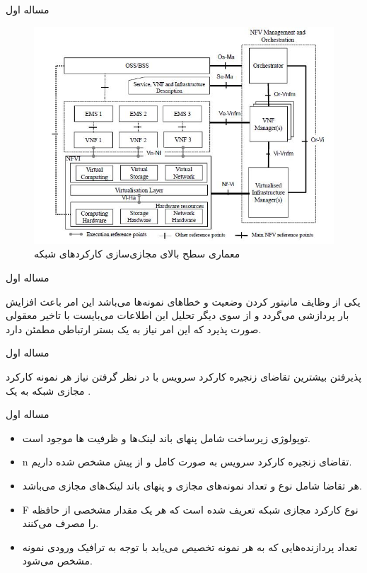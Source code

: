 \documentclass{beamer}
\makeatletter
\newcommand{\RTList}{\raggedleft\rightskip\@totalleftmargin}
\makeatother
\begin{document}
\begin{persian}
\begin{frame}{مساله اول}
\begin{center}
\begin{figure}
        \includegraphics[scale=0.4]{images/nfv-arch.jpg}
        \caption{معماری سطح بالای مجازی‌سازی کارکردهای شبکه}
    \end{figure}\end{center}
\end{frame}
\begin{frame}{مساله اول}
    \par
    یکی از وظایف  مانیتور کردن وضعیت و خطاهای نمونه‌ها می‌باشد
    این امر باعث افزایش بار پردازشی  می‌گردد
    و از سوی دیگر تحلیل این اطلاعات می‌بایست با تاخیر معقولی صورت پذیرد که این امر
    نیاز به یک بستر ارتباطی مطمئن دارد.
\end{frame}
\begin{frame}{مساله اول}
    \par
    پذیرفتن بیشترین تقاضای زنجیره‌ کارکرد سرویس با در نظر گرفتن نیاز هر نمونه کارکرد مجازی شبکه به یک .
\end{frame}
\begin{frame}{مساله اول}
    \begin{itemize}\RTList{}
        \item توپولوژی زیرساخت شامل پنهای باند لینک‌ها و ظرفیت ها موجود است.
        \item n تقاضای زنجیره‌ کارکرد سرویس به صورت کامل و از پیش مشخص شده داریم.
        \item هر تقاضا شامل نوع و تعداد نمونه‌های مجازی و پنهای باند لینک‌های مجازی می‌باشد.
        \item F نوع کارکرد مجازی شبکه تعریف شده است که هر یک مقدار مشخصی از حافظه را مصرف می‌کنند.
        \item تعداد پردازنده‌هایی که به هر نمونه تخصیص می‌یابد با توجه به ترافیک ورودی نمونه مشخص می‌شود.

\end{itemize}
\end{frame}
\end{persian}
\end{document}
